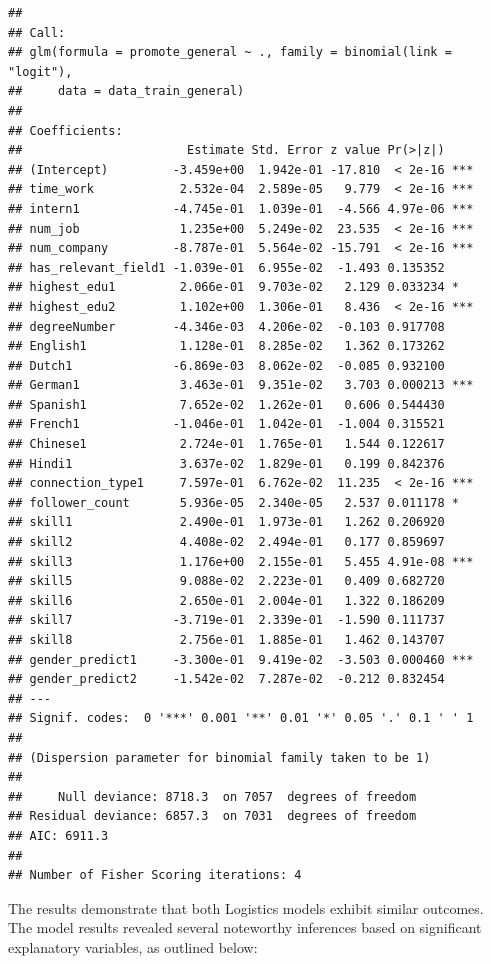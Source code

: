 \documentclass[11pt,]{article}
\begin{document}
\begin{verbatim}
## 
## Call:
## glm(formula = promote_general ~ ., family = binomial(link = "logit"), 
##     data = data_train_general)
## 
## Coefficients:
##                       Estimate Std. Error z value Pr(>|z|)    
## (Intercept)         -3.459e+00  1.942e-01 -17.810  < 2e-16 ***
## time_work            2.532e-04  2.589e-05   9.779  < 2e-16 ***
## intern1             -4.745e-01  1.039e-01  -4.566 4.97e-06 ***
## num_job              1.235e+00  5.249e-02  23.535  < 2e-16 ***
## num_company         -8.787e-01  5.564e-02 -15.791  < 2e-16 ***
## has_relevant_field1 -1.039e-01  6.955e-02  -1.493 0.135352    
## highest_edu1         2.066e-01  9.703e-02   2.129 0.033234 *  
## highest_edu2         1.102e+00  1.306e-01   8.436  < 2e-16 ***
## degreeNumber        -4.346e-03  4.206e-02  -0.103 0.917708    
## English1             1.128e-01  8.285e-02   1.362 0.173262    
## Dutch1              -6.869e-03  8.062e-02  -0.085 0.932100    
## German1              3.463e-01  9.351e-02   3.703 0.000213 ***
## Spanish1             7.652e-02  1.262e-01   0.606 0.544430    
## French1             -1.046e-01  1.042e-01  -1.004 0.315521    
## Chinese1             2.724e-01  1.765e-01   1.544 0.122617    
## Hindi1               3.637e-02  1.829e-01   0.199 0.842376    
## connection_type1     7.597e-01  6.762e-02  11.235  < 2e-16 ***
## follower_count       5.936e-05  2.340e-05   2.537 0.011178 *  
## skill1               2.490e-01  1.973e-01   1.262 0.206920    
## skill2               4.408e-02  2.494e-01   0.177 0.859697    
## skill3               1.176e+00  2.155e-01   5.455 4.91e-08 ***
## skill5               9.088e-02  2.223e-01   0.409 0.682720    
## skill6               2.650e-01  2.004e-01   1.322 0.186209    
## skill7              -3.719e-01  2.339e-01  -1.590 0.111737    
## skill8               2.756e-01  1.885e-01   1.462 0.143707    
## gender_predict1     -3.300e-01  9.419e-02  -3.503 0.000460 ***
## gender_predict2     -1.542e-02  7.287e-02  -0.212 0.832454    
## ---
## Signif. codes:  0 '***' 0.001 '**' 0.01 '*' 0.05 '.' 0.1 ' ' 1
## 
## (Dispersion parameter for binomial family taken to be 1)
## 
##     Null deviance: 8718.3  on 7057  degrees of freedom
## Residual deviance: 6857.3  on 7031  degrees of freedom
## AIC: 6911.3
## 
## Number of Fisher Scoring iterations: 4
\end{verbatim}

The results demonstrate that both Logistics models exhibit similar
outcomes. The model results revealed several noteworthy inferences based
on significant explanatory variables, as outlined below:
\end{document}
